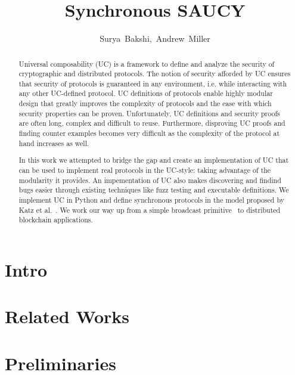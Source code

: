 \documentclass[11pt]{article}
\title{\bf Synchronous SAUCY}
\author{\mbox{Surya Bakshi, Andrew Miller}}
\begin{document}
\pagestyle{fancy}

\maketitle

\begin{abstract}
Universal composability (UC) is a framework to define and analyze the security of cryptographic and distributed protocols.
The notion of security afforded by UC ensures that security of protocols is guaranteed in any environment, i.e. while interacting with any other UC-defined protocol. 
UC definitions of protocols enable highly modular design that greatly improves the complexity of protocols and the ease with which security properties can be proven.
Unfortunately, UC definitions and security proofs are often long, complex and difficult to reuse. 
Furthermore, disproving UC proofs and finding counter examples becomes very difficult as the complexity of the protocol at hand increases as well.

In this work we attempted to bridge the gap and create an implementation of UC that can be used to implement real protocols in the UC-style: taking advantage of the modularity it provides.
An impementation of UC also makes discovering and findind bugs easier through existing techniques like fuzz testing and executable definitions.
We implement UC in Python and define synchronous protocols in the model proposed by Katz et al.~\cite{katz-clock}. 
We work our way up from a simple broadcast primitive~\cite{bracha-broadcast} to distributed blockchain applications.
\end{abstract}

\section{Intro}

\section{Related Works}


\section{Preliminaries}

%	
\end{document}
